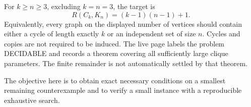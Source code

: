 For $k\ge n\ge3$, excluding $k=n=3$, the target is
\[
R(C_k,K_n)=(k-1)(n-1)+1.
\]
Equivalently, every graph on the displayed number of vertices should contain either a cycle of length exactly $k$ or an independent set of size $n$. Cycles and copies are not required to be induced. The live page labels the problem DECIDABLE and records a theorem covering all sufficiently large clique parameters. The finite remainder is not automatically settled by that theorem.

The objective here is to obtain exact necessary conditions on a smallest remaining counterexample and to verify a small instance with a reproducible exhaustive search.

